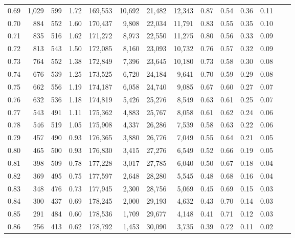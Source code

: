 \begin{tabular}{rrrrrrrrrrrrrr}
0.69 &  1,029 &  599 &    1.72 &  169,553 &   10,692 &  21,482 &  12,343 &  0.87 &  0.54 &  0.36 &      0.11 \\
0.70 &    884 &  552 &    1.60 &  170,437 &    9,808 &  22,034 &  11,791 &  0.83 &  0.55 &  0.35 &      0.10 \\
0.71 &    835 &  516 &    1.62 &  171,272 &    8,973 &  22,550 &  11,275 &  0.80 &  0.56 &  0.33 &      0.09 \\
0.72 &    813 &  543 &    1.50 &  172,085 &    8,160 &  23,093 &  10,732 &  0.76 &  0.57 &  0.32 &      0.09 \\
0.73 &    764 &  552 &    1.38 &  172,849 &    7,396 &  23,645 &  10,180 &  0.73 &  0.58 &  0.30 &      0.08 \\
0.74 &    676 &  539 &    1.25 &  173,525 &    6,720 &  24,184 &   9,641 &  0.70 &  0.59 &  0.29 &      0.08 \\
0.75 &    662 &  556 &    1.19 &  174,187 &    6,058 &  24,740 &   9,085 &  0.67 &  0.60 &  0.27 &      0.07 \\
0.76 &    632 &  536 &    1.18 &  174,819 &    5,426 &  25,276 &   8,549 &  0.63 &  0.61 &  0.25 &      0.07 \\
0.77 &    543 &  491 &    1.11 &  175,362 &    4,883 &  25,767 &   8,058 &  0.61 &  0.62 &  0.24 &      0.06 \\
0.78 &    546 &  519 &    1.05 &  175,908 &    4,337 &  26,286 &   7,539 &  0.58 &  0.63 &  0.22 &      0.06 \\
0.79 &    457 &  490 &    0.93 &  176,365 &    3,880 &  26,776 &   7,049 &  0.55 &  0.64 &  0.21 &      0.05 \\
0.80 &    465 &  500 &    0.93 &  176,830 &    3,415 &  27,276 &   6,549 &  0.52 &  0.66 &  0.19 &      0.05 \\
0.81 &    398 &  509 &    0.78 &  177,228 &    3,017 &  27,785 &   6,040 &  0.50 &  0.67 &  0.18 &      0.04 \\
0.82 &    369 &  495 &    0.75 &  177,597 &    2,648 &  28,280 &   5,545 &  0.48 &  0.68 &  0.16 &      0.04 \\
0.83 &    348 &  476 &    0.73 &  177,945 &    2,300 &  28,756 &   5,069 &  0.45 &  0.69 &  0.15 &      0.03 \\
0.84 &    300 &  437 &    0.69 &  178,245 &    2,000 &  29,193 &   4,632 &  0.43 &  0.70 &  0.14 &      0.03 \\
0.85 &    291 &  484 &    0.60 &  178,536 &    1,709 &  29,677 &   4,148 &  0.41 &  0.71 &  0.12 &      0.03 \\
0.86 &    256 &  413 &    0.62 &  178,792 &    1,453 &  30,090 &   3,735 &  0.39 &  0.72 &  0.11 &      0.02 \\

\end{tabular}
